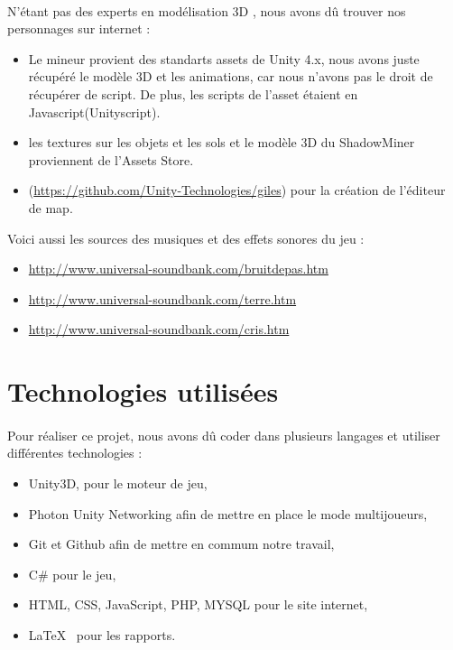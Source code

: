 \documentclass[titlepage, 13px, a4paper]{report}
\begin{document}
\paragraph*{} \hspace{0pt}
N'étant pas des experts en modélisation 3D , nous avons dû trouver nos personnages sur internet : 
{\begin{itemize}
	\item Le mineur provient des standarts assets de Unity 4.x, nous avons juste récupéré le modèle 3D et les animations,	
	car nous n'avons pas le droit de récupérer de script. De plus, les scripts de l'asset étaient en Javascript(Unityscript).
	\item les textures sur les objets et les sols et le modèle 3D du ShadowMiner proviennent de 
		l'Assets Store.
	\item (\url{https://github.com/Unity-Technologies/giles}) pour la création de l'éditeur de map. \\
\end{itemize}} 

Voici aussi les sources des musiques et des effets sonores du jeu : \\
{\begin{itemize}
	\item \url{http://www.universal-soundbank.com/bruitdepas.htm}
	\item \url{http://www.universal-soundbank.com/terre.htm}
	\item \url{http://www.universal-soundbank.com/cris.htm} \\
\end{itemize}} 

\section{Technologies utilisées}
\paragraph*{} \hspace{0pt}
Pour réaliser ce projet, nous avons dû coder dans plusieurs langages et utiliser différentes technologies : 
{\begin{itemize}
	\item Unity3D, pour le moteur de jeu,
	\item Photon Unity Networking afin de mettre en place le mode multijoueurs,
	\item Git et Github afin de mettre en commum notre travail,
	\item C\# pour le jeu, 
	\item HTML, CSS, JavaScript, PHP, MYSQL pour le site internet,
	\item \LaTeX ~ pour les rapports. \\
\end{itemize}}
\end{document}
